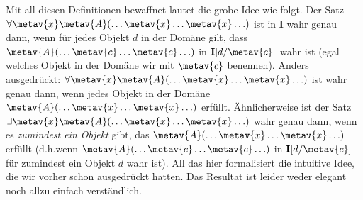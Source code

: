 Mit all diesen Definitionen bewaffnet lautet die grobe Idee wie folgt. Der Satz $\forall \metav{x}\metav{A}(\ldots \metav{x} \ldots \metav{x} \ldots)$ ist in $\mathbf{I}$ wahr genau dann, wenn für jedes Objekt $d$ in der Domäne gilt, dass $\metav{A}(\ldots \metav{c} \ldots \metav{c}\ldots)$ in $\mathbf{I}[d/\metav{c}]$ wahr ist (egal welches Objekt in der Domäne wir mit $\metav{c}$ benennen). Anders ausgedrückt: $\forall \metav{x} \metav{A}(\ldots \metav{x} \ldots \metav{x} \ldots)$ ist wahr genau dann, wenn jedes Objekt in der Domäne $\metav{A}(\ldots \metav{x} \ldots \metav{x} \ldots)$ erfüllt. Ähnlicherweise ist der Satz $\exists \metav{x}\metav{A}(\ldots \metav{x} \ldots \metav{x} \ldots)$ wahr genau dann, wenn es \emph{zumindest ein Objekt} gibt, das $\metav{A}(\ldots \metav{x} \ldots \metav{x} \ldots)$ erfüllt (d.h.\@ wenn $\metav{A}(\ldots \metav{c} \ldots \metav{c} \ldots)$ in $\mathbf{I}[d/\metav{c}]$ für zumindest ein Objekt $d$ wahr ist).
All das hier formalisiert die intuitive Idee, die wir vorher schon ausgedrückt hatten. Das Resultat ist leider weder elegant noch allzu einfach verständlich. 

